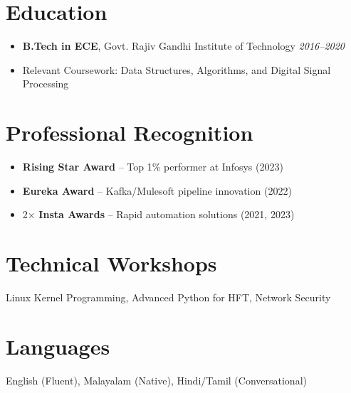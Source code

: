 \documentclass[letterpaper,11pt]{article}
\begin{document}
\section*{Education}\vspace{6pt}
\begin{itemize}
    \item \textbf{B.Tech in ECE}, Govt. Rajiv Gandhi Institute of Technology \hfill \textit{2016--2020}
    \item Relevant Coursework: Data Structures, Algorithms, and Digital Signal Processing
\end{itemize}

\section*{Professional Recognition}\vspace{6pt}
\begin{itemize}
    \item \textbf{Rising Star Award} – Top 1\% performer at Infosys (2023)
    \item \textbf{Eureka Award} – Kafka/Mulesoft pipeline innovation (2022)
    \item 2× \textbf{Insta Awards} – Rapid automation solutions (2021, 2023)
\end{itemize}

\section*{Technical Workshops}\vspace{6pt}
Linux Kernel Programming, Advanced Python for HFT, Network Security

\section*{Languages}\vspace{6pt}
English (Fluent), Malayalam (Native), Hindi/Tamil (Conversational)
\end{document}
